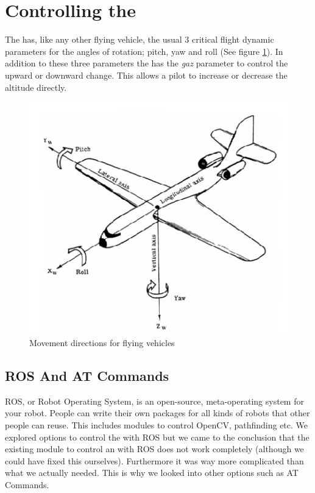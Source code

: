 \section{Controlling the \Ardrone}
The \Ardrone has, like any other flying vehicle, the usual 3 critical flight dynamic parameters for the angles of rotation; pitch, yaw and roll (See figure 
\ref{pitchYawRoll}). In addition to these three parameters the \Ardrone has the \textit{gaz} parameter to control the upward or downward change. This allows
a pilot to increase or decrease the altitude directly. 

\begin{figure}[h!]
    \centering
        \includegraphics[scale=0.5]{pitchYawRoll.png}
    \caption{Movement directions for flying vehicles}
    \label{pitchYawRoll}
\end{figure}

\subsection{ROS And AT Commands}
ROS, or Robot Operating System, is an open-source, meta-operating system for your robot. People can write their own packages for all kinds of robots that other people
can reuse. This includes modules to control OpenCV, pathfinding etc. We explored options to control the \Ardrone with ROS but we came to the conclusion that the existing
module to control an \Ardrone with ROS does not work completely (although we
could have fixed this ourselves). Furthermore it was way more complicated than what we actually needed. 
This is why we looked into other options such as AT Commands. \\

